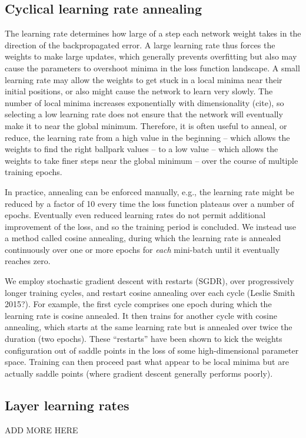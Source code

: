 \documentclass[fleqn,usenatbib]{mnras}
\begin{document}
\subsection{Cyclical learning rate annealing}
The learning rate determines how large of a step each network weight takes in the direction of the backpropagated error.
A large learning rate thus forces the weights to make large updates, which generally prevents overfitting but also may cause the parameters to overshoot minima in the loss function landscape.
A small learning rate may allow the weights to get stuck in a local minima near their initial positions, or also might cause the network to learn very slowly.
The number of local minima increases exponentially with dimensionality (cite), so selecting a low learning rate does not ensure that the network will eventually make it to near the global minimum.
Therefore, it is often useful to anneal, or reduce, the learning rate from a high value in the beginning -- which allows the weights to find the right ballpark values -- to a low value -- which allows the weights to take finer steps near the global minimum -- over the course of multiple training epochs.

In practice, annealing can be enforced manually, e.g., the learning rate might be reduced by a factor of 10 every time the loss function plateaus over a number of epochs.
Eventually even reduced learning rates do not permit additional improvement of the loss, and so the training period is concluded.
We instead use a method called cosine annealing, during which the learning rate is annealed continuously over one or more epochs for \textit{each} mini-batch until it eventually reaches zero.


We employ stochastic gradient descent with restarts (SGDR), over progressively longer training cycles, and restart cosine annealing over each cycle (Leslie Smith 2015?). 
For example, the first cycle comprises one epoch during which the learning rate is cosine annealed.
It then trains for another cycle with cosine annealing, which starts at the same learning rate but is annealed over twice the duration (two epochs).
These ``restarts'' have been shown to kick the weights configuration out of saddle points in the loss of some high-dimensional parameter space.
Training can then proceed past what appear to be local minima but are actually saddle points (where gradient descent generally performs poorly).


\subsection{Layer learning rates}
ADD MORE HERE
\end{document}
